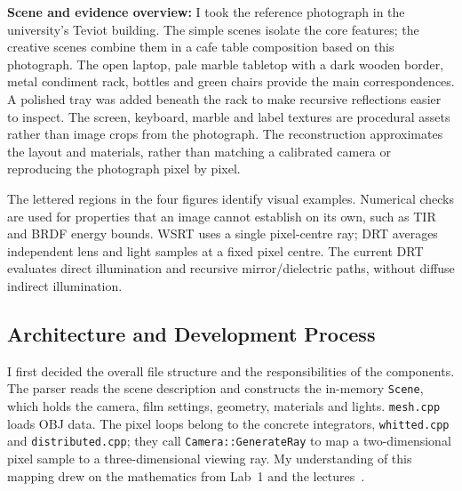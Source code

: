\documentclass[11pt,a4paper]{article}
\begin{document}
\textbf{Scene and evidence overview:} I took the reference photograph in the university's Teviot building. The simple scenes isolate the core features; the creative scenes combine them in a cafe table composition based on this photograph. The open laptop, pale marble tabletop with a dark wooden border, metal condiment rack, bottles and green chairs provide the main correspondences. A polished tray was added beneath the rack to make recursive reflections easier to inspect. The screen, keyboard, marble and label textures are procedural assets rather than image crops from the photograph. The reconstruction approximates the layout and materials, rather than matching a calibrated camera or reproducing the photograph pixel by pixel.

The lettered regions in the four figures identify visual examples. Numerical checks are used for properties that an image cannot establish on its own, such as TIR and BRDF energy bounds. WSRT uses a single pixel-centre ray; DRT averages independent lens and light samples at a fixed pixel centre. The current DRT evaluates direct illumination and recursive mirror/dielectric paths, without diffuse indirect illumination.

\subsection{Architecture and Development Process}
I first decided the overall file structure and the responsibilities of the components. The parser reads the scene description and constructs the in-memory \texttt{Scene}, which holds the camera, film settings, geometry, materials and lights. \texttt{mesh.cpp} loads OBJ data. The pixel loops belong to the concrete integrators, \texttt{whitted.cpp} and \texttt{distributed.cpp}; they call \texttt{Camera::GenerateRay} to map a two-dimensional pixel sample to a three-dimensional viewing ray. My understanding of this mapping drew on the mathematics from Lab~1 and the lectures~\cite[Part~I, pp.~1--2]{cgr-notes}.
\end{document}
